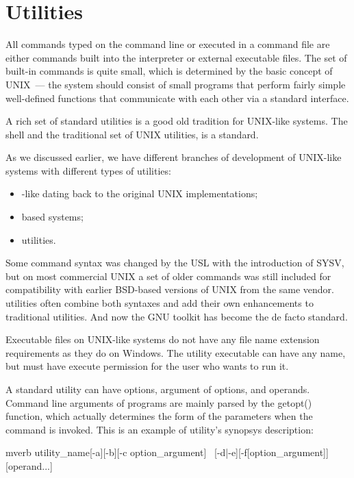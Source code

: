 \section*{Utilities}

All commands typed on the command line or executed in a command file are
either commands built into the interpreter or external executable files.
The set of built-in commands is quite small, which is determined by the
basic concept of UNIX~--- the system should consist of small programs that
perform fairly simple well-defined functions that communicate with each
other via a standard interface.

A rich set of standard utilities is a good old tradition for UNIX-like
systems. The shell and the traditional set of UNIX utilities,
is a  standard.

As we discussed earlier, we have different branches of development of
UNIX-like systems with different types of utilities:
\begin{itemize}
\item {}-like dating back to the original UNIX implementations;
\item {} based systems;
\item {} utilities.
\end{itemize}

Some command syntax was changed by the USL with the introduction of SYSV,
but on most commercial UNIX a set of older commands was still included
for compatibility with earlier BSD-based versions of UNIX from the same vendor.
 utilities often combine both syntaxes and add their own
enhancements to traditional utilities. And now the GNU toolkit has become
the de facto standard.

Executable files on UNIX-like systems do not have any file name extension
requirements as they do on Windows. The utility executable can have any name,
but must have execute permission for the user who wants to run it.

A standard utility can have options, argument of options, and operands.
Command line arguments of programs are mainly parsed by the getopt()
function, which actually determines the form of the parameters when
the command is invoked. This is an example of utility's synopsys description:

\begin{code}{mverb}
utility_name[-a][-b][-c option_argument] \
                          [-d|-e][-f[option_argument]][operand...]
\end{code}


